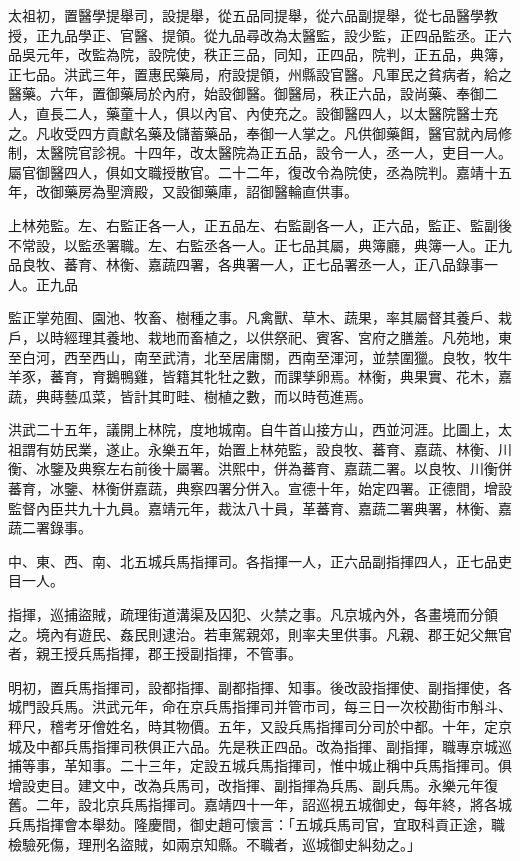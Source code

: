 太祖初，置醫學提舉司，設提舉，從五品同提舉，從六品副提舉，從七品醫學教授，正九品學正、官醫、提領。從九品尋改為太醫監，設少監，正四品監丞。正六品吳元年，改監為院，設院使，秩正三品，同知，正四品，院判，正五品，典簿，正七品。洪武三年，置惠民藥局，府設提領，州縣設官醫。凡軍民之貧病者，給之醫藥。六年，置御藥局於內府，始設御醫。御醫局，秩正六品，設尚藥、奉御二人，直長二人，藥童十人，俱以內官、內使充之。設御醫四人，以太醫院醫士充之。凡收受四方貢獻名藥及儲蓄藥品，奉御一人掌之。凡供御藥餌，醫官就內局修制，太醫院官診視。十四年，改太醫院為正五品，設令一人，丞一人，吏目一人。屬官御醫四人，俱如文職授散官。二十二年，復改令為院使，丞為院判。嘉靖十五年，改御藥房為聖濟殿，又設御藥庫，詔御醫輪直供事。

上林苑監。左、右監正各一人，正五品左、右監副各一人，正六品，監正、監副後不常設，以監丞署職。左、右監丞各一人。正七品其屬，典簿廳，典簿一人。正九品良牧、蕃育、林衡、嘉蔬四署，各典署一人，正七品署丞一人，正八品錄事一人。正九品

監正掌苑囿、園池、牧畜、樹種之事。凡禽獸、草木、蔬果，率其屬督其養戶、栽戶，以時經理其養地、栽地而畜植之，以供祭祀、賓客、宮府之膳羞。凡苑地，東至白河，西至西山，南至武清，北至居庸關，西南至渾河，並禁圍獵。良牧，牧牛羊豕，蕃育，育鵝鴨雞，皆籍其牝牡之數，而課孳卵焉。林衡，典果實、花木，嘉蔬，典蒔藝瓜菜，皆計其町畦、樹植之數，而以時苞進焉。

洪武二十五年，議開上林院，度地城南。自牛首山接方山，西並河涯。比圖上，太祖謂有妨民業，遂止。永樂五年，始置上林苑監，設良牧、蕃育、嘉蔬、林衡、川衡、冰鑒及典察左右前後十屬署。洪熙中，併為蕃育、嘉蔬二署。以良牧、川衡併蕃育，冰鑒、林衡併嘉蔬，典察四署分併入。宣德十年，始定四署。正德間，增設監督內臣共九十九員。嘉靖元年，裁汰八十員，革蕃育、嘉蔬二署典署，林衡、嘉蔬二署錄事。

中、東、西、南、北五城兵馬指揮司。各指揮一人，正六品副指揮四人，正七品吏目一人。

指揮，巡捕盜賊，疏理街道溝渠及囚犯、火禁之事。凡京城內外，各畫境而分領之。境內有遊民、姦民則逮治。若車駕親郊，則率夫里供事。凡親、郡王妃父無官者，親王授兵馬指揮，郡王授副指揮，不管事。

明初，置兵馬指揮司，設都指揮、副都指揮、知事。後改設指揮使、副指揮使，各城門設兵馬。洪武元年，命在京兵馬指揮司并管市司，每三日一次校勘街市斛斗、秤尺，稽考牙儈姓名，時其物價。五年，又設兵馬指揮司分司於中都。十年，定京城及中都兵馬指揮司秩俱正六品。先是秩正四品。改為指揮、副指揮，職專京城巡捕等事，革知事。二十三年，定設五城兵馬指揮司，惟中城止稱中兵馬指揮司。俱增設吏目。建文中，改為兵馬司，改指揮、副指揮為兵馬、副兵馬。永樂元年復舊。二年，設北京兵馬指揮司。嘉靖四十一年，詔巡視五城御史，每年終，將各城兵馬指揮會本舉劾。隆慶間，御史趙可懷言：「五城兵馬司官，宜取科貢正途，職檢驗死傷，理刑名盜賊，如兩京知縣。不職者，巡城御史糾劾之。」

